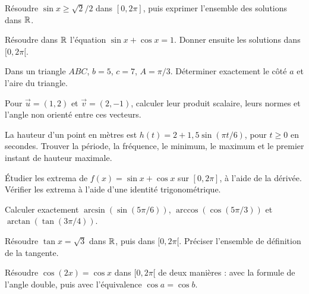 Résoudre \(\sin x\geq\sqrt2/2\) dans \([0,2\pi]\), puis exprimer l'ensemble des solutions dans \(\mathbb{R}\).

Résoudre dans \(\mathbb{R}\) l'équation \(\sin x+\cos x=1\). Donner ensuite les solutions dans \([0,2\pi[\).

Dans un triangle \(ABC\), \(b=5\), \(c=7\), \(A=\pi/3\). Déterminer exactement le côté \(a\) et l'aire du triangle.

Pour \(\vec u=(1,2)\) et \(\vec v=(2,-1)\), calculer leur produit scalaire, leurs normes et l'angle non orienté entre ces vecteurs.

La hauteur d'un point en mètres est \(h(t)=2+1{,}5\sin(\pi t/6)\), pour \(t\geq0\) en secondes. Trouver la période, la fréquence, le minimum, le maximum et le premier instant de hauteur maximale.

Étudier les extrema de \(f(x)=\sin x+\cos x\) sur \([0,2\pi]\), à l'aide de la dérivée. Vérifier les extrema à l'aide d'une identité trigonométrique.

Calculer exactement \(\arcsin(\sin(5\pi/6))\), \(\arccos(\cos(5\pi/3))\) et \(\arctan(\tan(3\pi/4))\).

Résoudre \(\tan x=\sqrt3\) dans \(\mathbb{R}\), puis dans \([0,2\pi[\). Préciser l'ensemble de définition de la tangente.

Résoudre \(\cos(2x)=\cos x\) dans \([0,2\pi[\) de deux manières : avec la formule de l'angle double, puis avec l'équivalence \(\cos a=\cos b\).
